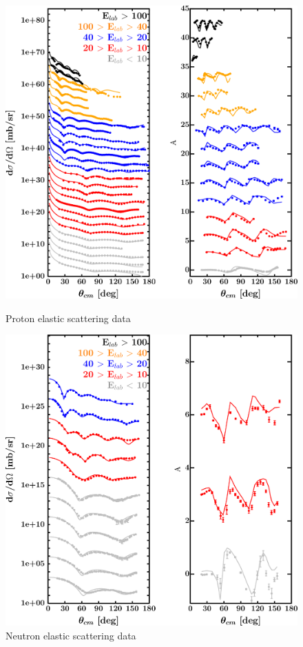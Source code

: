 \begin{figure}[H]
    \centering
    \begin{minipage}{0.45\textwidth}
        \centering
        \includegraphics[width=1.0\textwidth]{figures/ni58_protonElastic.png}
        \caption{Proton elastic scattering data}
        \label{DOMFitData_ni58_proton_elastic}
    \end{minipage}\hfill
    \begin{minipage}{0.45\textwidth}
        \centering
        \includegraphics[width=1.0\textwidth]{figures/ni58_neutronElastic.png}
        \caption{Neutron elastic scattering data}
        \label{DOMFitData_ni58_neutron_elastic}
    \end{minipage}
\end{figure}

